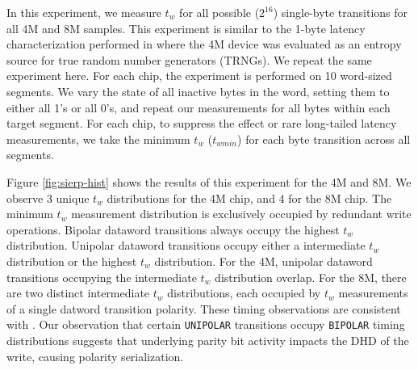
\label{sec:1byte}
\label{exp:iv}
In this experiment, we measure $t_w$ for all possible ($2^{16}$) single-byte transitions for all 4M and 8M samples.
This experiment is similar to the 1-byte latency characterization performed in \cite{tolga2024trng} where the 4M device was evaluated as an entropy source for true random number generators (TRNGs). We repeat the same experiment here. For each chip, the experiment is performed on 10 word-sized segments. We vary the state of all inactive bytes in the word, setting them to either all 1's or all 0's, and repeat our measurements for all bytes within each target segment. For each chip, to suppress the effect or rare long-tailed latency measurements, we take the minimum $t_w$ ($t_{wmin}$) for each byte transition across all segments.

Figure \ref{fig:sierp-hist} shows the results of this experiment for the 4M and 8M. We observe 3 unique $t_w$ distributions for the 4M chip, and 4 for the 8M chip. The minimum $t_w$ measurement distribution is exclusively occupied by redundant write operations. Bipolar dataword transitions always occupy the highest $t_w$ distribution. Unipolar dataword transitions occupy either a intermediate $t_w$ distribution or the highest $t_w$ distribution. For the 4M, unipolar dataword transitions occupying the intermediate $t_w$ distribution overlap. For the 8M, there are two distinct intermediate $t_w$ distributions, each occupied by $t_w$ measurements of a single datword transition polarity. These timing observations are consistent with \cite{tolga2024trng}. Our observation that certain \texttt{UNIPOLAR} transitions occupy \texttt{BIPOLAR} timing distributions suggests that underlying parity bit activity impacts the DHD of the write, causing polarity serialization.

